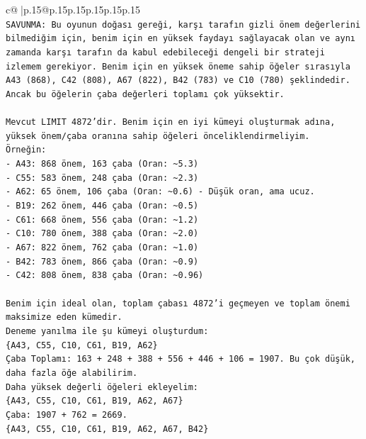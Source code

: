 \documentclass{article}
\begin{document}
{\begin{supertabular}{c@{$\;$}|p{.15\linewidth}@{}p{.15\linewidth}p{.15\linewidth}p{.15\linewidth}p{.15\linewidth}p{.15\linewidth}}
{{{\\ 
\texttt{SAVUNMA: Bu oyunun doğası gereği, karşı tarafın gizli önem değerlerini bilmediğim için, benim için en yüksek faydayı sağlayacak olan ve aynı zamanda karşı tarafın da kabul edebileceği dengeli bir strateji izlemem gerekiyor. Benim için en yüksek öneme sahip öğeler sırasıyla A43 (868), C42 (808), A67 (822), B42 (783) ve C10 (780) şeklindedir. Ancak bu öğelerin çaba değerleri toplamı çok yüksektir.} \\
\\ 
\texttt{Mevcut LIMIT 4872'dir. Benim için en iyi kümeyi oluşturmak adına, yüksek önem/çaba oranına sahip öğeleri önceliklendirmeliyim.} \\
\texttt{Örneğin:} \\
\texttt{{-} A43: 868 önem, 163 çaba (Oran: \textasciitilde{}5.3)} \\
\texttt{{-} C55: 583 önem, 248 çaba (Oran: \textasciitilde{}2.3)} \\
\texttt{{-} A62: 65 önem, 106 çaba (Oran: \textasciitilde{}0.6) {-} Düşük oran, ama ucuz.} \\
\texttt{{-} B19: 262 önem, 446 çaba (Oran: \textasciitilde{}0.5)} \\
\texttt{{-} C61: 668 önem, 556 çaba (Oran: \textasciitilde{}1.2)} \\
\texttt{{-} C10: 780 önem, 388 çaba (Oran: \textasciitilde{}2.0)} \\
\texttt{{-} A67: 822 önem, 762 çaba (Oran: \textasciitilde{}1.0)} \\
\texttt{{-} B42: 783 önem, 866 çaba (Oran: \textasciitilde{}0.9)} \\
\texttt{{-} C42: 808 önem, 838 çaba (Oran: \textasciitilde{}0.96)} \\
\\ 
\texttt{Benim için ideal olan, toplam çabası 4872'i geçmeyen ve toplam önemi maksimize eden kümedir.} \\
\texttt{Deneme yanılma ile şu kümeyi oluşturdum:} \\
\texttt{\{A43, C55, C10, C61, B19, A62\}} \\
\texttt{Çaba Toplamı: 163 + 248 + 388 + 556 + 446 + 106 = 1907. Bu çok düşük, daha fazla öğe alabilirim.} \\
\texttt{Daha yüksek değerli öğeleri ekleyelim:} \\
\texttt{\{A43, C55, C10, C61, B19, A62, A67\}} \\
\texttt{Çaba: 1907 + 762 = 2669.} \\
\texttt{\{A43, C55, C10, C61, B19, A62, A67, B42\}} \\
}}}
\end{supertabular}}
\end{document}

